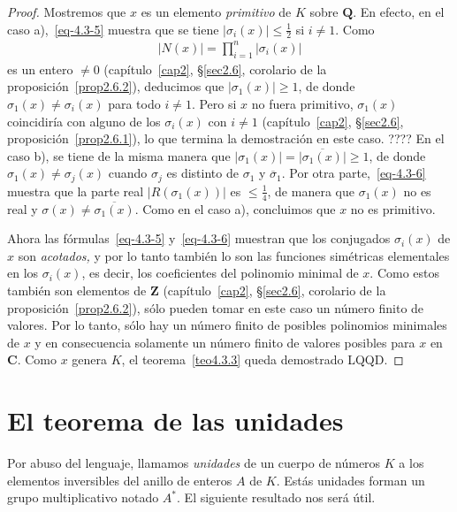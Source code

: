 \documentclass[oneside,bibtotoc,leqno,spanish]{amsbook}
\newcommand{\QQ}{\mathbf{Q}}
\newcommand{\ZZ}{\mathbf{Z}}
\newcommand{\CC}{\mathbf{C}}
\newcommand{\QED}{}%
\newcommand{\oline}[1]{\overline{#1}}
\newcommand{\abs}[1]{\left\lvert#1\right\rvert}
\numberwithin{equation}{section}
\theoremstyle{defi}
\theoremstyle{note}
\theoremstyle{rem}
\numberwithin{theorem}{section}
\numberwithin{proposition}{section}
\numberwithin{definition}{section}
\numberwithin{lemma}{section}
\numberwithin{corollary}{section}
\numberwithin{example}{section}
\numberwithin{footnote}{section}%
\begin{document}
\begin{proof}
Mostremos que $x$ es un elemento {\em primitivo} de $K$ sobre $\QQ$. En efecto, en el caso a),~\eqref{eq-4.3-5}
muestra que se tiene $\abs{\sigma_{i}(x)}\leq\frac{1}{2}$ si $i\neq 1$. Como
\begin{gather*}
\abs{N(x)} = \prod_{i=1}^{n}\abs{\sigma_{i}(x)}
\end{gather*}
es un entero $\neq 0$ (cap\'itulo~\ref{cap2}, \S\ref{sec2.6}, corolario de la proposici\'on~\ref{prop2.6.2}),
deducimos que $\abs{\sigma_{1}(x)}\geq 1$,
de donde $\sigma_{1}(x)\neq\sigma_{i}(x)$ para todo $i\neq 1$. Pero si $x$ no fuera primitivo,
$\sigma_{1}(x)$ coincidir\'ia con alguno de los $\sigma_{i}(x)$ con $i\neq 1$
(cap\'itulo~\ref{cap2}, \S\ref{sec2.6}, proposici\'on~\ref{prop2.6.1}),
lo que termina la demostraci\'on en este caso. ???? En el caso b), se tiene de la misma manera que
$\abs{\sigma_{1}(x)}=\oline{\abs{\sigma_{1}(x)}}\geq 1$, de donde $\sigma_{1}(x)\neq\sigma_{j}(x)$
cuando $\sigma_{j}$ es distinto de $\sigma_{1}$ y $\oline\sigma_{1}$. Por otra parte,~\eqref{eq-4.3-6}
muestra que la parte real $\abs{R(\sigma_{1}(x))}$ es $\leq\frac{1}{4}$, de manera que $\sigma_{1}(x)$
no es real y $\sigma(x)\neq\oline{\sigma_{1}(x)}$. Como en el caso a), concluimos que $x$ no es primitivo.

Ahora las f\'ormulas~\eqref{eq-4.3-5} y~\eqref{eq-4.3-6} muestran que los conjugados $\sigma_{i}(x)$ de $x$ son
{\em acotados,} y por lo tanto tambi\'en lo son las funciones sim\'etricas elementales en los $\sigma_{i}(x)$,
es decir, los coeficientes del polinomio minimal de $x$. Como estos tambi\'en son elementos de $\ZZ$
(cap\'itulo~\ref{cap2}, \S\ref{sec2.6}, corolario de la proposici\'on~\ref{prop2.6.2}),
s\'olo pueden tomar en este caso un n\'umero finito de valores.
Por lo tanto, s\'olo hay un n\'umero finito de posibles polinomios minimales de $x$ y en consecuencia
solamente un n\'umero finito de valores posibles para $x$ en $\CC$. Como $x$ genera $K$, el teorema~\ref{teo4.3.3} queda
demostrado LQQD.%
\end{proof}

\section{El teorema de las unidades}\label{sec4.4}

Por abuso del lenguaje, llamamos {\em unidades} de un cuerpo de n\'umeros $K$ a los elementos inversibles
del anillo de enteros $A$ de $K$. Est\'as unidades forman un grupo multiplicativo notado $A^{*}$. El
siguiente resultado nos ser\'a \'util.
\end{document}
